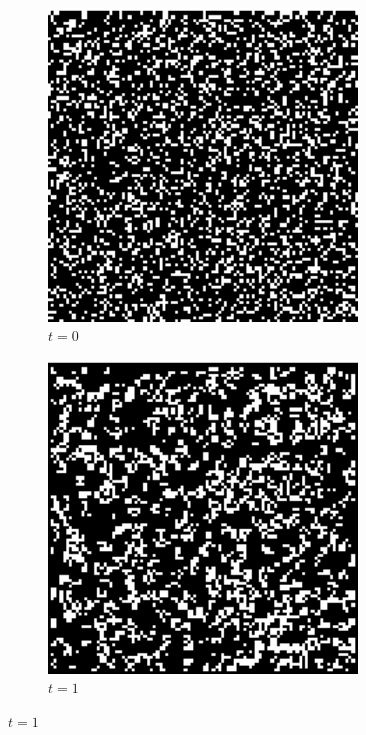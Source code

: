\documentclass[a4paper,10pt]{article}
\begin{document}
\begin{figure}
 \begin{subfigure}{0.4\textwidth}
  \includegraphics[width=0.9\textwidth]{genimg-game-of-life-1}
  \caption{$t = 0$}
 \end{subfigure}%
 \begin{subfigure}{0.4\textwidth}
  \includegraphics[width=0.9\textwidth]{genimg-game-of-life-2}
  \caption{$t = 1$}
 \end{subfigure}
 

\end{figure}
\end{document}

